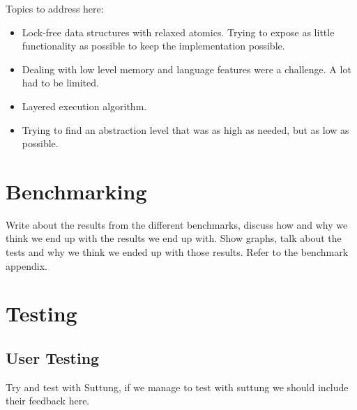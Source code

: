 Topics to address here:
\begin{itemize}
    \item
    Lock-free data structures with relaxed atomics. Trying to expose as little functionality as possible to keep the implementation possible.

    \item
    Dealing with low level memory and language features were a challenge. A lot had to be limited.

    \item
    Layered execution algorithm.

    \item
    Trying to find an abstraction level that was as high as needed, but as low as possible.
\end{itemize}

\chapter{Benchmarking}
\label{chap:benchmarking}
Write about the results from the different benchmarks,
discuss how and why we think we end up with the results we end up with.
Show graphs, talk about the tests and why we think we ended up with those results.
Refer to the benchmark appendix.

\chapter{Testing}
\label{chap:testing}

\section{User Testing}
Try and test with Suttung, if we manage to test with suttung
we should include their feedback here.

